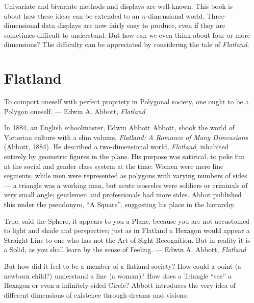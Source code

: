 \documentclass[
  letterpaper,
  10pt,
  krantz2]{krantz}
\renewenvironment{quote}{\begin{VF}}{\end{VF}}
\begin{document}
Univariate and bivariate methods and displays are well-known. This book
is about how these ideas can be extended to an \(n\)-dimensional world.
Three-dimensional data displays are now fairly easy to produce, even if
they are sometimes difficult to understand. But how can we even think
about four or more dimensions? The difficulty can be appreciated by
considering the tale of \emph{Flatland}.

\hypertarget{flatland}{%
\section*{Flatland}\label{flatland}}


\begin{quote}
To comport oneself with perfect propriety in Polygonal society, one
ought to be a Polygon oneself. --- Edwin A. Abbott, \emph{Flatland}
\end{quote}

In 1884, an English schoolmaster, Edwin Abbott Abbott, shook the world
of Victorian culture with a slim volume, \emph{Flatland: A Romance of
Many Dimensions} (\protect\hyperlink{ref-Abbott:1884}{Abbott, 1884}). He
described a two-dimensional world, \emph{Flatland}, inhabited entirely
by geometric figures in the plane. His purpose was satirical, to poke
fun at the social and gender class system at the time: Women were mere
line segments, while men were represented as polygons with varying
numbers of sides--- a triangle was a working man, but acute isosceles
were soldiers or criminals of very small angle; gentlemen and
professionals had more sides. Abbot published this under the pseudonym,
``A Square'', suggesting his place in the hierarchy.

\begin{quote}
True, said the Sphere; it appears to you a Plane, because you are not
accustomed to light and shade and perspective; just as in Flatland a
Hexagon would appear a Straight Line to one who has not the Art of Sight
Recognition. But in reality it is a Solid, as you shall learn by the
sense of Feeling. --- Edwin A. Abbott, \emph{Flatland}
\end{quote}

But how did it feel to be a member of a flatland society? How could a
point (a newborn child?) understand a line (a woman)? How does a
Triangle ``see'' a Hexagon or even a infinitely-sided Circle? Abbott
introduces the very idea of different dimensions of existence through
dreams and visions:
\end{document}
